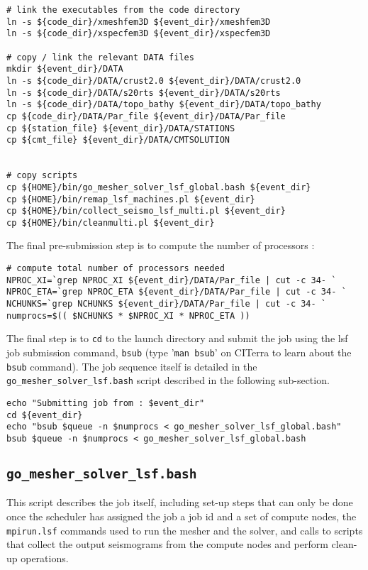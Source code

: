 \documentclass[onecolumn]{article}
\begin{document}
{\small
\begin{verbatim}
# link the executables from the code directory
ln -s ${code_dir}/xmeshfem3D ${event_dir}/xmeshfem3D
ln -s ${code_dir}/xspecfem3D ${event_dir}/xspecfem3D

# copy / link the relevant DATA files
mkdir ${event_dir}/DATA
ln -s ${code_dir}/DATA/crust2.0 ${event_dir}/DATA/crust2.0
ln -s ${code_dir}/DATA/s20rts ${event_dir}/DATA/s20rts
ln -s ${code_dir}/DATA/topo_bathy ${event_dir}/DATA/topo_bathy
cp ${code_dir}/DATA/Par_file ${event_dir}/DATA/Par_file
cp ${station_file} ${event_dir}/DATA/STATIONS
cp ${cmt_file} ${event_dir}/DATA/CMTSOLUTION


# copy scripts
cp ${HOME}/bin/go_mesher_solver_lsf_global.bash ${event_dir}
cp ${HOME}/bin/remap_lsf_machines.pl ${event_dir}
cp ${HOME}/bin/collect_seismo_lsf_multi.pl ${event_dir}
cp ${HOME}/bin/cleanmulti.pl ${event_dir}
\end{verbatim}}

The final pre-submission step is to compute the number of processors :

{\small
\begin{verbatim}
# compute total number of processors needed
NPROC_XI=`grep NPROC_XI ${event_dir}/DATA/Par_file | cut -c 34- `
NPROC_ETA=`grep NPROC_ETA ${event_dir}/DATA/Par_file | cut -c 34- `
NCHUNKS=`grep NCHUNKS ${event_dir}/DATA/Par_file | cut -c 34- `
numprocs=$(( $NCHUNKS * $NPROC_XI * NPROC_ETA ))
\end{verbatim}
}

The final step is to \texttt{cd} to the launch directory and submit
the job using the lsf job submission command, \texttt{bsub}
(type '\texttt{man bsub}' on CITerra to learn about the \texttt{bsub} command).
The job sequence itself is detailed in the \texttt{go\_mesher\_solver\_lsf.bash}
script described in the following sub-section.  

{\small
\begin{verbatim}
echo "Submitting job from : $event_dir"
cd ${event_dir}
echo "bsub $queue -n $numprocs < go_mesher_solver_lsf_global.bash"
bsub $queue -n $numprocs < go_mesher_solver_lsf_global.bash

\end{verbatim}}

\subsection{\texttt{go\_mesher\_solver\_lsf.bash}}

This script describes the job itself, including set-up steps that can only
be done once the scheduler has assigned the job a job id and a set of
compute nodes, the \texttt{mpirun.lsf} commands used to run the mesher and
the solver, and calls to scripts that collect the output seismograms from
the compute nodes and perform clean-up operations.
\end{document}
